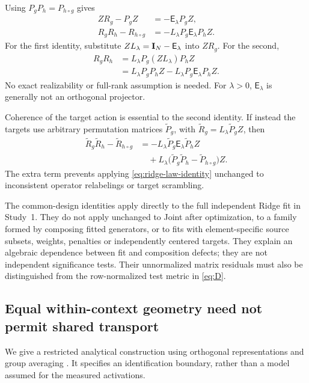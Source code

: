 Using $P_gP_h=P_{h\circ g}$ gives
\begin{align}
 ZR_g-P_gZ
 &=-\mathsf E_\lambda P_gZ,
 \label{eq:ridge-fit-identity}\\
 R_gR_h-R_{h\circ g}
 &=-L_\lambda P_g\mathsf E_\lambda P_hZ.
 \label{eq:ridge-law-identity}
\end{align}
For the first identity, substitute
$ZL_\lambda=\mathbf{I}_N-\mathsf E_\lambda$ into $ZR_g$.
For the second,
\[
 \begin{aligned}
 R_gR_h
 &=L_\lambda P_g(ZL_\lambda)P_hZ\\
 &=L_\lambda P_gP_hZ
   -L_\lambda P_g\mathsf E_\lambda P_hZ.
 \end{aligned}
\]
No exact realizability or full-rank assumption is needed.
For $\lambda>0$, $\mathsf E_\lambda$ is generally not
an orthogonal projector.

Coherence of the target action is essential to the
second identity.
If instead the targets use arbitrary permutation matrices
$\widetilde P_g$, with
$\widetilde R_g=L_\lambda\widetilde P_gZ$, then
\[
 \begin{aligned}
 \widetilde R_g\widetilde R_h
 -\widetilde R_{h\circ g}
 &=-L_\lambda\widetilde P_g
      \mathsf E_\lambda\widetilde P_hZ\\
 &\quad+
 L_\lambda
 \bigl(\widetilde P_g\widetilde P_h
       -\widetilde P_{h\circ g}\bigr)Z.
 \end{aligned}
\]
The extra term prevents applying
\cref{eq:ridge-law-identity} unchanged to inconsistent
operator relabelings or target scrambling.

The common-design identities apply directly to the full
independent Ridge fit in Study~1.
They do not apply unchanged to Joint after optimization,
to a family formed by composing fitted generators, or
to fits with element-specific source subsets, weights,
penalties or independently centered targets.
They explain an algebraic dependence between fit and
composition defects; they are not independent
significance tests.
Their unnormalized matrix residuals must also be
distinguished from the row-normalized test metric in
\cref{eq:D}.


\subsection{Equal within-context geometry need not permit shared transport}
\label{app:orientation}

We give a restricted analytical construction using
orthogonal representations and group averaging
\citep{serre1977linear}.
It specifies an identification boundary, rather than
a model assumed for the measured activations.

